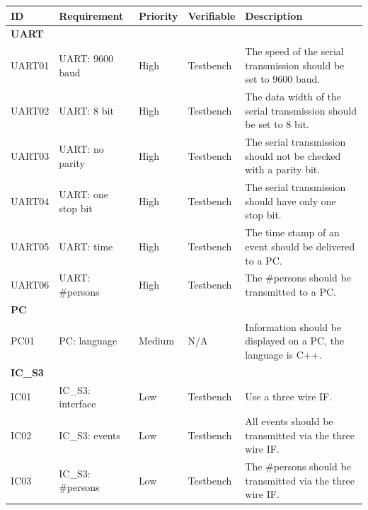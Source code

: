 \documentclass[12pt,a4 paper] {report}
\begin{document}
\begin{center}
	\begin{tabular}{|p{1.5cm}|p{3.5cm}|p{1.5cm}|p{2cm}|p{5.5cm}|}
		\hline
		\textbf{ID} & \textbf{Requirement} & \textbf{Priority} & \textbf{Verifiable} & \textbf{Description} \\
		\hline
		\multicolumn{5}{|l|}{\textbf{UART}} \\
		\hline
		UART01 & UART: 9600 baud & High &  Testbench & The speed of the serial transmission should be set to 9600 baud. \\
		\hline
		UART02 & UART: 8 bit & High & Testbench & The data width of the serial transmission should be set to 8 bit. \\
		\hline
		UART03 & UART: no parity & High & Testbench & The serial transmission should not be checked with a parity bit. \\
		\hline
		UART04 & UART: one stop bit & High  & Testbench & The serial transmission should have only one stop bit. \\
		\hline
		UART05 & UART: time & High & Testbench  & The time stamp of an event should be delivered to a PC. \\
		\hline
		UART06 & UART: \#persons & High &  Testbench &  The \#persons should be transmitted to a PC. \\
		\hline
		\multicolumn{5}{|l|}{\textbf{PC}} \\
		\hline	
		PC01 & PC: language & Medium & N/A &  Information should be displayed on a PC, the language is C++. \\
		\hline
		\multicolumn{5}{|l|}{\textbf{IC\_S3}} \\
		\hline
		IC01 & IC\_S3: interface & Low & Testbench & Use a three wire IF. \\
		\hline
		IC02 & IC\_S3: events & Low & Testbench & All events should be transmitted via the three wire IF. \\
		\hline
		IC03 & IC\_S3: \#persons & Low  & Testbench & The \#persons should be transmitted via the three wire IF. \\
		\hline
	\end{tabular}
\end{center}

\newpage
\end{document}
